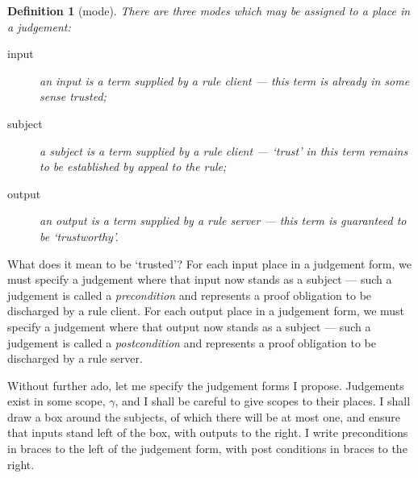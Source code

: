 \documentclass{jfp1}
\newtheorem{definition}[theorem]{Definition}
\begin{document}
\begin{definition}[mode]
  There are three modes which may be assigned to a place in a judgement:
  \begin{description}
  \item[input] an input is a term supplied by a rule client ---
    this term is already in some sense trusted;
  \item[subject] a subject is a term supplied by a rule client ---
    `trust' in this term remains to be established by appeal to the rule;
  \item[output] an output is a term supplied by a rule server ---
    this term is guaranteed to be `trustworthy'.
  \end{description}
\end{definition}

What does it mean to be `trusted'? For each input place in a judgement
form, we must specify a judgement where that input now stands as a
subject --- such a judgement is called a \emph{precondition} and
represents a proof obligation to be discharged by a rule client. For
each output place in a judgement form, we must specify a judgement
where that output now stands as a subject --- such a judgement is
called a \emph{postcondition} and represents a proof obligation to be
discharged by a rule server.

Without further ado, let me specify the judgement forms I propose. Judgements
exist in some scope, $\gamma$, and I shall be careful to give scopes to their
places. I shall draw a box around the subjects, of which there will be at
most one, and ensure that inputs stand left of the box, with outputs to the right.
I write preconditions in braces to the left of the judgement form, with post
conditions in braces to the right.
\end{document}
